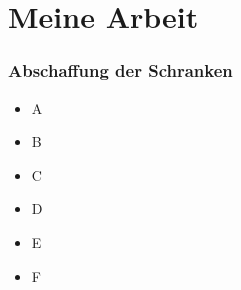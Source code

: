 \section{Meine Arbeit}

\begin{frame}
	\frametitle{Abschaffung der Schranken}
	\begin{itemize}
		\item A
		\item B
		\item C
		\item D
		\item E
		\item F
	\end{itemize}
\end{frame}
